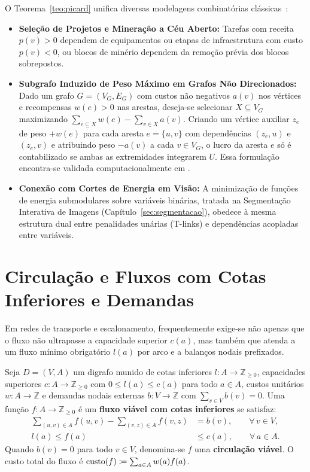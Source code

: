  O Teorema~\ref{teo:picard} unifica diversas modelagens combinatórias clássicas~\cite{ahuja1993network, korte2018combinatorial}:
\begin{itemize}
    \item \textbf{Seleção de Projetos e Mineração a Céu Aberto:} Tarefas com receita $p(v) > 0$ dependem de equipamentos ou etapas de infraestrutura com custo $p(v) < 0$, ou blocos de minério dependem da remoção prévia dos blocos sobrepostos.
    \item \textbf{Subgrafo Induzido de Peso Máximo em Grafos Não Direcionados:} Dado um grafo $G = (V_G, E_G)$ com custos não negativos $a(v)$ nos vértices e recompensas $w(e) > 0$ nas arestas, deseja-se selecionar $X \subseteq V_G$ maximizando $\sum_{e \subseteq X} w(e) - \sum_{v \in X} a(v)$. Criando um vértice auxiliar $z_e$ de peso $+w(e)$ para cada aresta $e = \{u, v\}$ com dependências $(z_e, u)$ e $(z_e, v)$ e atribuindo peso $-a(v)$ a cada $v \in V_G$, o lucro da aresta $e$ só é contabilizado se ambas as extremidades integrarem $U$. Essa formulação encontra-se validada computacionalmente em .
    \item \textbf{Conexão com Cortes de Energia em Visão:} A minimização de funções de energia submodulares sobre variáveis binárias, tratada na Segmentação Interativa de Imagens (Capítulo~\ref{sec:segmentacao}), obedece à mesma estrutura dual entre penalidades unárias (T-links) e dependências acopladas entre variáveis.
\end{itemize}


\section{Circulação e Fluxos com Cotas Inferiores e Demandas}\label{sec:cotas_inferiores}

Em redes de transporte e escalonamento, frequentemente exige-se não apenas que o fluxo não ultrapasse a capacidade superior $c(a)$, mas também que atenda a um fluxo mínimo obrigatório $l(a)$ por arco e a balanços nodais prefixados.

\begin{definicao}
Seja $D = (V, A)$ um digrafo munido de cotas inferiores $l: A \to \mathbb{Z}_{\ge 0}$, capacidades superiores $c: A \to \mathbb{Z}_{\ge 0}$ com $0 \le l(a) \le c(a)$ para todo $a \in A$, custos unitários $w: A \to \mathbb{Z}$ e demandas nodais externas $b: V \to \mathbb{Z}$ com $\sum_{v \in V} b(v) = 0$. Uma função $f: A \to \mathbb{Z}_{\ge 0}$ é um \textbf{fluxo viável com cotas inferiores} se satisfaz:
\begin{align}
    \sum_{(u, v) \in A} f(u, v) - \sum_{(v, z) \in A} f(v, z) &= b(v), \qquad \forall\, v \in V, \label{eq:balanco_cotas} \\
    l(a) \le f(a) &\le c(a), \qquad \forall\, a \in A. \label{eq:limites_cotas}
\end{align}
Quando $b(v) = 0$ para todo $v \in V$, denomina-se $f$ uma \textbf{circulação viável}. O custo total do fluxo é $\operatorname{custo}(f) \coloneqq \sum_{a \in A} w(a) f(a)$.
\end{definicao}

